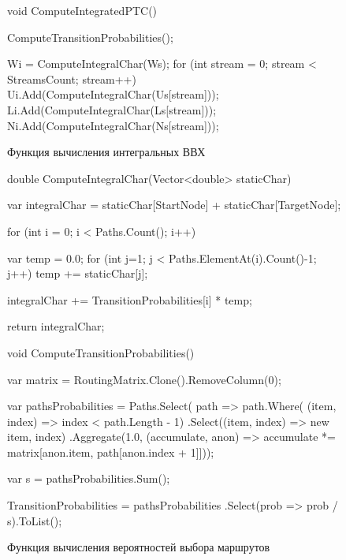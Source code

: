 \documentclass[oneside, draft, 14pt, a4paper]{extreport}
\begin{document}
\begin{figure}[h!]
	\begin{listing}{1}
void ComputeIntegratedPTC()
{
  ComputeTransitionProbabilities();

  Wi = ComputeIntegralChar(Ws);
  for (int stream = 0; stream < StreamsCount; stream++)
  {
	Ui.Add(ComputeIntegralChar(Us[stream]));
	Li.Add(ComputeIntegralChar(Ls[stream]));
	Ni.Add(ComputeIntegralChar(Ns[stream]));
  }
}\end{listing}

	\caption{Функция вычисления интегральных ВВХ}
	\label{pic:function_computeIPTC}
\end{figure}

\begin{figure}[h!]
	\begin{listing}{1}
double ComputeIntegralChar(Vector<double> staticChar)
{
  var integralChar =
	staticChar[StartNode] + staticChar[TargetNode];

  for (int i = 0; i < Paths.Count(); i++)
  {
	var temp = 0.0;
	for (int j=1; j < Paths.ElementAt(i).Count()-1; j++)
	  temp += staticChar[j];

	integralChar += TransitionProbabilities[i] * temp;
  }

  return integralChar;
}\end{listing}

	\caption{}
	\label{pic:function_computeIntegralChar}
\end{figure}

\begin{figure}[h!]
	\begin{listing}{1}
void ComputeTransitionProbabilities()
  {
	var matrix = RoutingMatrix.Clone().RemoveColumn(0);

	var pathsProbabilities = 
	Paths.Select(
	path => path.Where(
	(item, index) => index < path.Length - 1)
	.Select((item, index) => new {item, index})
	.Aggregate(1.0, (accumulate, anon) => accumulate *=
	matrix[anon.item, path[anon.index + 1]]));

	var s = pathsProbabilities.Sum();

	TransitionProbabilities = pathsProbabilities
	.Select(prob => prob / s).ToList();
}\end{listing}

	\caption{Функция вычисления вероятностей выбора маршрутов}
	\label{pic:function_computeTransitionProbabilities}
\end{figure}
\end{document}
